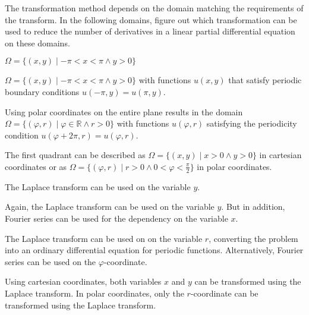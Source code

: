 The transformation method depends on the domain matching the requirements
of the transform.
In the following domains, figure out which transformation can be used
to reduce the number of derivatives in a linear partial differential
equation on these domains.
\begin{teilaufgaben}
\item
$\Omega = \{ (x,y) \mid -\pi < x <  \pi\wedge y > 0\}$
\item
$\Omega = \{ (x,y) \mid -\pi < x <  \pi\wedge y > 0\}$ with
functions $u(x,y)$ that satisfy periodic boundary conditions
$u(-\pi,y)=u(\pi,y)$.
\item
Using polar coordinates on the entire plane results in the domain
$\Omega = \{ (\varphi,r) \mid \varphi \in \mathbb{R}\wedge r > 0\}$
with functions $u(\varphi,r)$ satisfying the periodicity condition
$u(\varphi+2\pi,r)=u(\varphi,r)$.
\item
The first quadrant can be described as
$\Omega=\{(x,y)\mid x>0\wedge y>0\}$
in cartesian coordinates or as
$\Omega= \{(\varphi,r)\mid r>0\wedge 0< \varphi<\frac{\pi}2\}$
in polar coordinates.
\end{teilaufgaben}


\begin{loesung}
\begin{teilaufgaben}
\item
The Laplace transform can be used on the variable $y$.
\item
Again, the Laplace transform can be used on the variable $y$.
But in addition, Fourier series can be used for the dependency 
on the variable $x$.
\item
The Laplace transform can be used on on the variable $r$, converting
the problem into an ordinary differential equation for periodic functions.
Alternatively, Fourier series can be used on the $\varphi$-coordinate.
\item
Using cartesian coordinates, both variables $x$ and $y$ can be transformed
using the Laplace transform.
In polar coordinates, only the $r$-coordinate can be transformed using
the Laplace transform.
\qedhere
\end{teilaufgaben}
\end{loesung}

